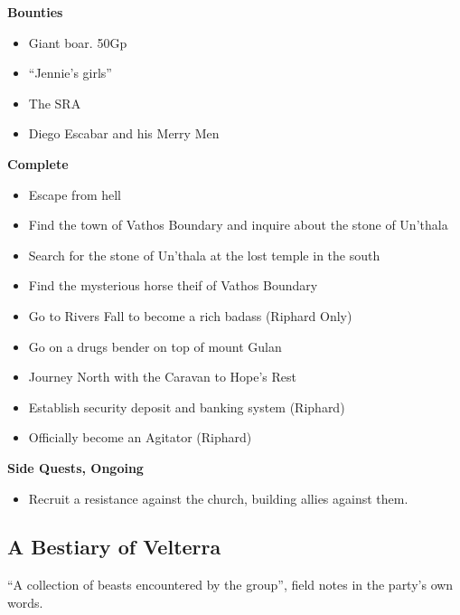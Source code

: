 \textbf{Bounties}
\begin{itemize}
  \item Giant boar. 50Gp
  \item ``Jennie's girls''
  \item The SRA
  \item Diego Escabar and his Merry Men
\end{itemize}

\textbf{Complete}
\begin{itemize}
  \item Escape from hell
  \item Find the town of Vathos Boundary and inquire about the stone of Un'thala
  \item Search for the stone of Un'thala at the lost temple in the south
  \item Find the mysterious horse theif of Vathos Boundary
  \item Go to Rivers Fall to become a rich badass (Riphard Only)
  \item Go on a drugs bender on top of mount Gulan
  \item Journey North with the Caravan to Hope's Rest
  \item Establish security deposit and banking system (Riphard)
  \item Officially become an Agitator (Riphard)
\end{itemize}

\textbf{Side Quests, Ongoing}
\begin{itemize}
  \item Recruit a resistance against the church, building allies against them.
\end{itemize}

\subsection*{A Bestiary of Velterra}

``A collection of beasts encountered by the group'', field notes in the party's own words.

